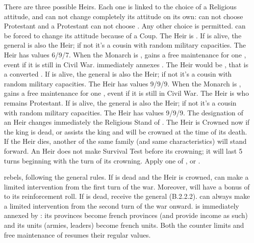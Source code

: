 \begin{digressions}



  \phevnt
  \aparag There are three possible Heirs.  Each one is linked to the choice of
  a Religious attitude, and \FRA can not change completely its attitude on its
  own: \CATHCR can not choose Protestant and a Protestant \FRA can not choose
  \CATHCR.  Any other choice is permitted.  \FRA can be forced to change its
  attitude because of a Coup.
  \aparag[\CATHCR] The Heir is .  If  is alive, the general is also the Heir; if not it's a cousin with
  random military capacities. The Heir has values 6/9/7.  When the Monarch is
  , \FRA gains a free maintenance for one \ARMY
  \faceplus, event if it is still in Civil War. \FRA immediately annexes
  \provinceLorraine.
  \aparag[\CATHCO] The Heir would be , that is a converted
  . If \leaderNavarre is alive, the general is also
  the Heir; if not it's a cousin with random military capacities. The Heir has
  values 9/9/9. When the Monarch is , \FRA gains a free
  maintenance for one \ARMY \faceplus, event if it is still in Civil War.
  \aparag[Protestant] The Heir is  who remains
  Protestant. If \leaderNavarre is alive, the general is also the Heir; if not
  it's a cousin with random military capacities. The Heir has values 9/9/9.
   The designation of an Heir changes
  immediately the Religious Stand of \FRA. The Heir is Crowned now if the king
  is dead, or assists the king and will be crowned at the time of its
  death. If the Heir dies, another of the same family (and same
  characteristics) will stand forward. An Heir does not make Survival Test
  before its crowning; it will last 5 turns beginning with the turn of its
  crowning.
  \aparag
  Apply one of ,
   or
  .



  \phevnt
  \aparag \lig rebels, following the general rules.
  \aparag If  is dead and the Heir is crowned, \LIG can
  make a limited intervention from the first turn of the war.  Moreover, \lig
  will have a bonus of  to its reinforcement roll.
  \aparag If  is dead, \lig receive the general
  \leaderMayenne (B.2.2.2).
  \aparag \LIG can always make a limited intervention from the second turn of
  the war onward.
  \aparag \hug is immediately annexed by \FRA: its provinces become french
  provinces (and provide income as such) and its units (armies, leaders)
  become french units. Both the counter limits and free maintenance of \FRA
  resumes their regular values.



\end{digressions}
